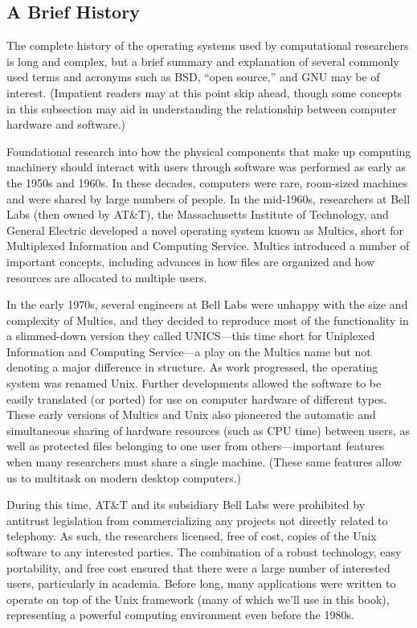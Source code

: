 \documentclass[
]{memoir}
\begin{document}
\hypertarget{a-brief-history}{%
\subsection*{A Brief History}\label{a-brief-history}}

The complete history of the operating systems used by computational researchers is long and complex, but a brief summary and explanation of several commonly used terms and acronyms such as BSD, \enquote{open source,} and GNU may be of interest. (Impatient readers may at this point skip ahead, though some concepts in this subsection may aid in understanding the relationship between computer hardware and software.)

Foundational research into how the physical components that make up computing machinery should interact with users through software was performed as early as the 1950s and 1960s. In these decades, computers were rare, room-sized machines and were shared by large numbers of people. In the mid-1960s, researchers at Bell Labs (then owned by AT\&T), the Massachusetts Institute of Technology, and General Electric developed a novel operating system known as Multics, short for Multiplexed Information and Computing Service. Multics introduced a number of important concepts, including advances in how files are organized and how resources are allocated to multiple users.

In the early 1970s, several engineers at Bell Labs were unhappy with the size and complexity of Multics, and they decided to reproduce most of the functionality in a slimmed-down version they called UNICS---this time short for Uniplexed Information and Computing Service---a play on the Multics name but not denoting a major difference in structure. As work progressed, the operating system was renamed Unix. Further developments allowed the software to be easily translated (or ported) for use on computer hardware of different types. These early versions of Multics and Unix also pioneered the automatic and simultaneous sharing of hardware resources (such as CPU time) between users, as well as protected files belonging to one user from others---important features when many researchers must share a single machine. (These same features allow us to multitask on modern desktop computers.)

During this time, AT\&T and its subsidiary Bell Labs were prohibited by antitrust legislation from commercializing any projects not directly related to telephony. As such, the researchers licensed, free of cost, copies of the Unix software to any interested parties. The combination of a robust technology, easy portability, and free cost ensured that there were a large number of interested users, particularly in academia. Before long, many applications were written to operate on top of the Unix framework (many of which we'll use in this book), representing a powerful computing environment even before the 1980s.
\end{document}
